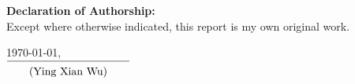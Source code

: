 {\sffamily\bfseries\Large Declaration of Authorship:}\\

Except where otherwise indicated, this report is my own original work.

\vspace{1 cm}
\today,
\vspace{0.1 cm}
\\
\phantom{x}\hfill $\overline{\text{\quad\quad\raisebox{-4mm}{(\AuthorName)}\quad\quad}}$
\newpage
